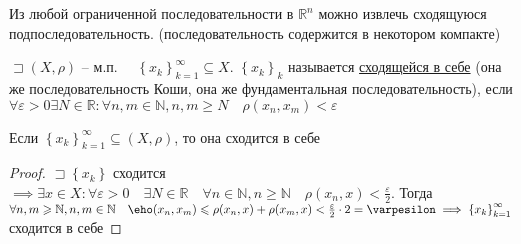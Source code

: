 \documentclass{book}
\newcommand\N{\ensuremath{\mathbb{N}}}
\newcommand\R{\ensuremath{\mathbb{R}}}
\theoremstyle{definition}
\begin{document}
\begin{corollary}
     Из любой ограниченной последовательности в $\R^n$ можно извлечь сходящуюся подпоследовательность. (последовательность содержится в некотором компакте)
\end{corollary}

\begin{definition}
    $\sqsupset (X, \rho)$ -- м.п. $\quad \left\{ x_k \right\} _{k=1}^{\infty }\subseteq X$. $\left\{ x_k \right\} _k$ называется \underline{сходящейся в себе} (она же последовательность Коши, она же фундаментальная последовательность), если $\forall \varepsilon>0\exists N\in \R: \forall n, m\in \N , n, m \geqslant N\quad \rho(x_{n} , x_{m} )<\varepsilon$
\end{definition}

\begin{statement}
    Если $\left\{ x_k \right\} _{k=1}^{\infty } \subseteq (X, \rho)$, то она сходится в себе
\end{statement}
\begin{proof}
    $\sqsupset \left\{ x_k \right\} $ сходится $\implies \exists x\in X: \forall \varepsilon>0\quad \exists N\in \R\quad \forall n\in \N , n\geqslant \N \quad \rho(x_{n} , x)<\frac{\varepsilon}{2}$. Тогда $\forall n, m\geqslant \N , n, m\in \N \quad \eho(x_{n} , x_{m} )\leqslant \rho(x_{n} , x) + \rho(x_{m} , x)<\frac{\varepsilon}{2}\cdot 2 = \varpesilon \implies \left\{ x_k \right\} _{k=1}^{\infty }$ сходится в себе
\end{proof}
\end{document}
